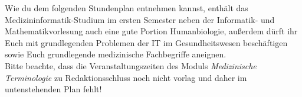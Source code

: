 Wie du dem folgenden Stundenplan entnehmen kannst, enthält das Medizininformatik-Studium im ersten Semester neben der Informatik- und Mathematikvorlesung auch eine gute Portion Humanbiologie, außerdem dürft ihr Euch mit grundlegenden Problemen der IT im Gesundheitswesen beschäftigen sowie Euch grundlegende medizinische Fachbegriffe aneignen.\\
Bitte beachte, dass die Veranstaltungszeiten des Moduls \textit{Medizinische Terminologie} zu Redaktionsschluss noch nicht vorlag und daher im untenstehenden Plan fehlt! \\
\noindent{}

